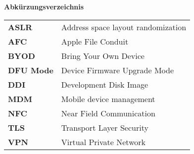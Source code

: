 %
%
% 
% 
% 

\begin{center}
{\Large\bfseries Abkürzungsverzeichnis}
\end{center}

\begin{table*}[htbp]
		\begin{tabular}{ll}
		     \textbf{ASLR} & Address space layout randomization \\
		     \textbf{AFC} & Apple File Conduit\\
		     \textbf{BYOD} & Bring Your Own Device\\
		     \textbf{DFU Mode} & Device Firmware Upgrade Mode\\
		     \textbf{DDI} & Development Disk Image \\
		     \textbf{MDM} & Mobile device management \\
		     \textbf{NFC} & Near Field Communication \\
 		     \textbf{TLS}  & Transport Layer Security \\
 		 	 \textbf{VPN} & Virtual Private Network \\
		\end{tabular}
\end{table*}